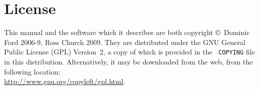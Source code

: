 
\section{License}

This manual and the software which it describes are both copyright \copyright\
Dominic Ford 2006-9, Ross Church 2009. They are distributed under the GNU
General Public License (GPL) Version~2, a copy of which is provided in the {\tt
COPYING} file in this distribution. Alternatively, it may be downloaded from the web, from
the following location:\\ \url{http://www.gnu.org/copyleft/gpl.html}.


